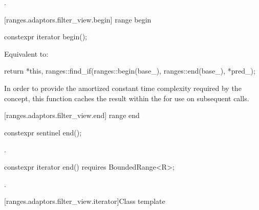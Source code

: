 \begin{itemdescr}
\pnum
\returns {}.
\end{itemdescr}

[ranges.adaptors.filter_view.begin]{ range begin}

%
\begin{itemdecl}
constexpr iterator begin();
\end{itemdecl}

\begin{itemdescr}
\pnum
\effects Equivalent to:
\begin{codeblock}
return {*this, ranges::find_if(ranges::begin(base_), ranges::end(base_), *pred_)};
\end{codeblock}

\pnum
\remarks In order to provide the amortized constant time complexity required by
the  concept, this function caches the result within the
 for use on subsequent calls.
\end{itemdescr}

[ranges.adaptors.filter_view.end]{ range end}

%
\begin{itemdecl}
constexpr sentinel end();
\end{itemdecl}

\begin{itemdescr}
\pnum
\returns {}.
\end{itemdescr}

\begin{itemdecl}
constexpr iterator end() requires BoundedRange<R>;
\end{itemdecl}

\begin{itemdescr}
\pnum
\returns {}.
\end{itemdescr}

[ranges.adaptors.filter_view.iterator]{Class template }

